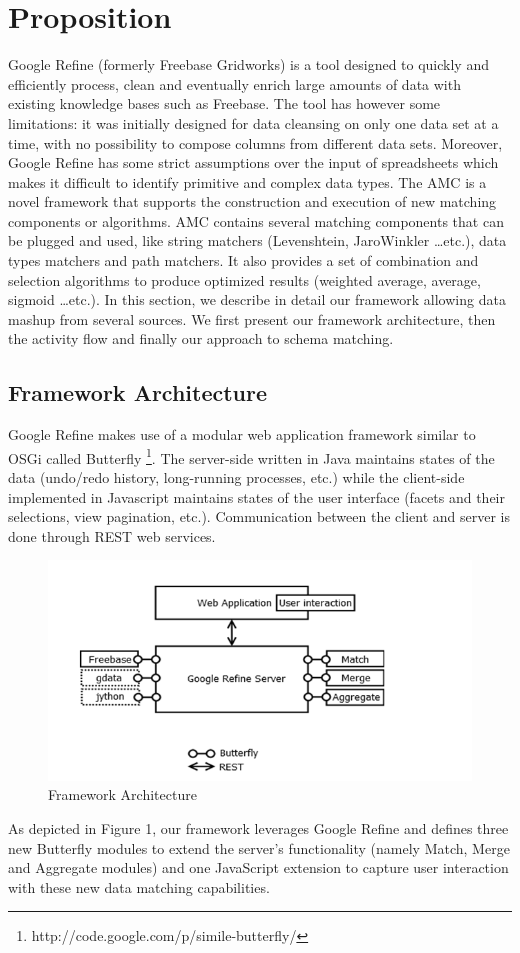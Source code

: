 \documentclass{sig-alternate}
\begin{document}
\section{Proposition}

Google Refine (formerly Freebase Gridworks) is a tool designed to quickly and efficiently process, clean and eventually enrich large amounts of data with existing knowledge bases such as Freebase. The tool has however some limitations: it was initially designed for data cleansing on only one data set at a time, with no possibility to compose columns from different data sets. Moreover, Google Refine has some strict assumptions over the input of spreadsheets which makes it difficult to identify primitive and complex data types.
The AMC is a novel framework that supports the construction and execution of new matching components or algorithms. AMC contains several matching components that can be plugged and used, like string matchers (Levenshtein, JaroWinkler \dots  etc.), data types matchers and path matchers. It also provides a set of combination and selection algorithms to produce optimized results (weighted average, average, sigmoid \dots  etc.).  
In this section, we describe in detail our framework allowing data mashup from several sources. We first present our framework architecture, then the activity flow and finally our approach to schema matching.

\subsection{Framework Architecture}
Google Refine makes use of a modular web application framework similar to OSGi called Butterfly \footnote{http://code.google.com/p/simile-butterfly/}. The server-side written in Java maintains states of the data (undo/redo history, long-running processes, etc.) while the client-side implemented in Javascript maintains states of the user interface (facets and their selections, view pagination, etc.). Communication between the client and server is done through REST web services.
\begin{figure}[ht!]
  \centering
    \includegraphics[scale=0.6]{architecture-1.png} 
  \caption{Framework Architecture}
\end{figure}
As depicted in Figure 1, our framework leverages Google Refine and defines three new Butterfly modules to extend the server's functionality (namely Match, Merge and Aggregate modules) and one JavaScript extension to capture user interaction with these new data matching capabilities. 
\end{document}
